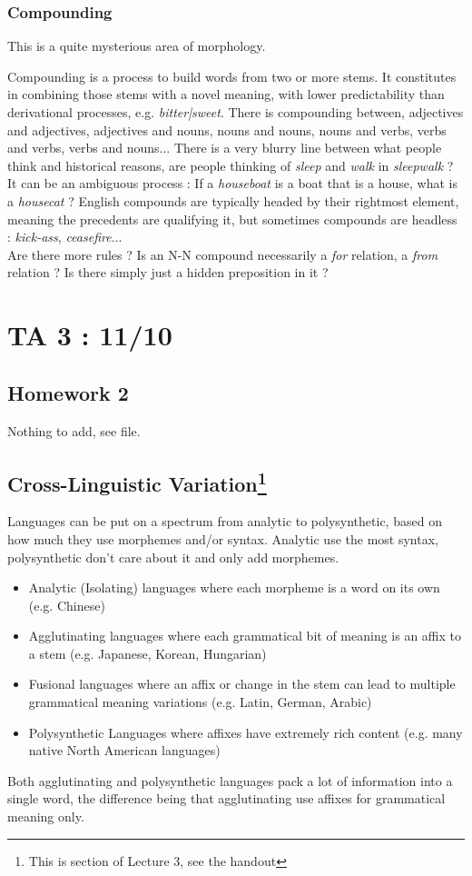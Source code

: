 \documentclass{cours}
\begin{document}
\subsubsection{Compounding}
This is a quite mysterious area of morphology.

Compounding is a process to build words from two or more stems. It constitutes in combining those stems with a novel meaning, with lower predictability than derivational processes, e.g. \textsl{bitter|sweet}. There is compounding between, adjectives and adjectives, adjectives and nouns, nouns and nouns, nouns and verbs, verbs and verbs, verbs and nouns... There is a very blurry line between what people think and historical reasons, are people thinking of \textsl{sleep} and \textsl{walk} in \textsl{sleepwalk} ?\\
It can be an ambiguous process\! : If a \textsl{houseboat} is a boat that is a house, what is a \textsl{housecat} ? English compounds are typically headed by their rightmost element, meaning the precedents are qualifying it, but sometimes compounds are headless\! : \textsl{kick-ass}, \textsl{ceasefire}...\\
Are there more rules ? Is an N-N compound necessarily a \textit{for} relation, a \textit{from} relation ? Is there simply just a hidden preposition in it ? 


\section{TA 3\! : 11/10}
\subsection{Homework 2}
Nothing to add, see file. 

\subsection[Cross-Linguistic Variation]{Cross-Linguistic Variation\footnote{This is section of Lecture 3, see the handout}}
Languages can be put on a spectrum from analytic to polysynthetic, based on how much they use morphemes and/or syntax.
Analytic use the most syntax, polysynthetic don't care about it and only add morphemes.
\begin{itemize}
    \item Analytic (Isolating) languages where each morpheme is a word on its own (e.g. Chinese)
    \item Agglutinating languages where each grammatical bit of meaning is an affix to a stem (e.g. Japanese, Korean, Hungarian)
    \item Fusional languages where an affix or change in the stem can lead to multiple grammatical meaning variations (e.g. Latin, German, Arabic)
    \item Polysynthetic Languages where affixes have extremely rich content (e.g. many native North American languages)
\end{itemize}
Both agglutinating and polysynthetic languages pack a lot of information into a single word, the difference being that agglutinating use affixes for grammatical meaning only.
\end{document}
